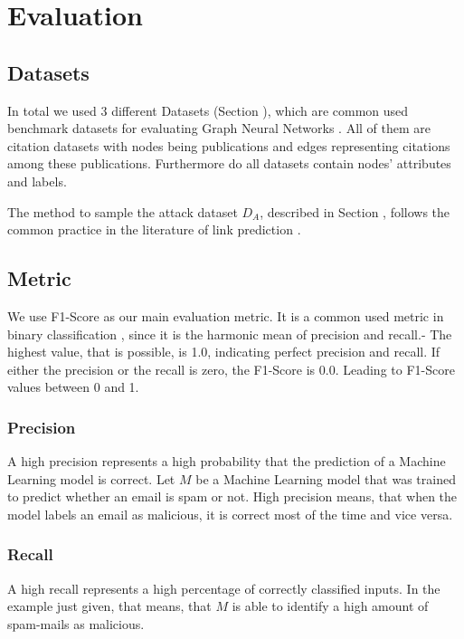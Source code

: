 \chapter{Evaluation}

    \section{Datasets}
        In total we used 3 different Datasets (Section ), which are common used benchmark datasets for evaluating Graph Neural Networks \cite{acharya2019feature, gao2019graphnas, gcn}.
        All of them are citation datasets with nodes being publications and edges representing citations among these publications.        
        Furthermore do all datasets contain nodes' attributes and labels.

        The method to sample the attack dataset $D_A$, described in Section , follows the common practice in the literature of link prediction \cite{BHPZ17, grover2016node2vec}.

    \section{Metric}
        We use F1-Score as our main evaluation metric.
        It is a common used metric in binary classification \cite{lipton2014thresholding, santus2016features, woodbridge2016predicting}, since it is the harmonic mean of precision and recall.-
        The highest value, that is possible, is 1.0, indicating perfect precision and recall.
        If either the precision or the recall is zero, the F1-Score is 0.0.
        Leading to F1-Score values between 0 and 1.

        \subsection*{Precision}
            A high precision represents a high probability that the prediction of a Machine Learning model is correct.
            Let $M$ be a Machine Learning model that was trained to predict whether an email is spam or not.
            High precision means, that when the model labels an email as malicious, it is correct most of the time and vice versa.

        \subsection*{Recall}
            A high recall represents a high percentage of correctly classified inputs.
            In the example just given, that means, that $M$ is able to identify a high amount of spam-mails as malicious.

